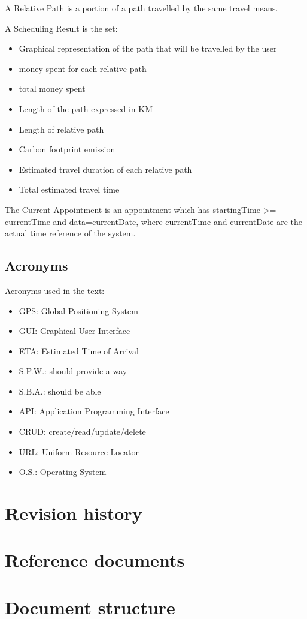 \begin{definition}
A Relative Path is a  portion of a path travelled by the same travel means.
\end{definition}
 

\begin{definition}
A Scheduling Result is the set:
\begin{itemize}
\item Graphical representation of the path that will be travelled by the user
\item money spent for each relative path
\item total money spent 
\item Length of the path expressed in KM
\item Length of relative path 
\item Carbon footprint emission
\item Estimated travel duration of each relative path
\item Total estimated travel time
\end{itemize}
\end{definition}

\begin{definition}
The Current Appointment is an appointment which has startingTime >= currentTime and data=currentDate, where currentTime and  currentDate are the actual time reference of the system.
\end{definition}


\subsection{Acronyms}
Acronyms used in the text:
\begin{itemize}
\item GPS: Global Positioning System
\item GUI: Graphical User Interface
\item ETA: Estimated Time of Arrival
\item S.P.W.: should provide a way
\item S.B.A.: should be able 
\item API: Application Programming Interface
\item CRUD: create/read/update/delete
\item URL: Uniform Resource Locator
\item O.S.: Operating System
\end{itemize}


\section{Revision history}

\section{Reference documents}

\section{Document structure}

 
